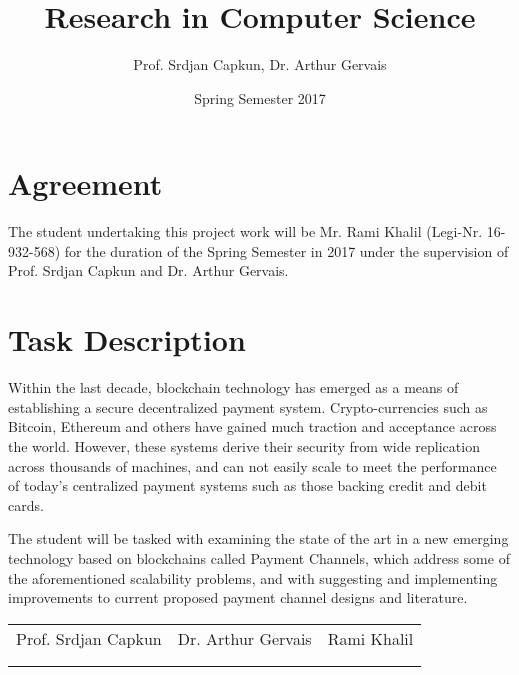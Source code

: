 \documentclass[12pt]{article}
\title{Research in Computer Science}
\date{Spring Semester 2017}
\author{Prof. Srdjan Capkun, Dr. Arthur Gervais}
\begin{document}
\maketitle

\section{Agreement}
The student undertaking this project work will be Mr. Rami Khalil (Legi-Nr. 16-932-568) for the duration of the Spring Semester in 2017 under the supervision of Prof. Srdjan Capkun and Dr. Arthur Gervais.

\section{Task Description}
Within the last decade, blockchain technology has emerged as a means of establishing a secure decentralized payment system. Crypto-currencies such as Bitcoin, Ethereum and others have gained much traction and acceptance across the world. However, these systems derive their security from wide replication across thousands of machines, and can not easily scale to meet the performance of today's centralized payment systems such as those backing credit and debit cards.

The student will be tasked with examining the state of the art in a new emerging technology based on blockchains called Payment Channels, which address some of the aforementioned scalability problems, and with suggesting and implementing improvements to current proposed payment channel designs and literature.

\vspace{5em}

\begin{tabular}{c c c}

Prof. Srdjan Capkun & Dr. Arthur Gervais & Rami Khalil \\

\\

\underline{\hspace{4cm}} & \underline{\hspace{4cm}} & \underline{\hspace{4cm}} \\

\end{tabular}
\end{document}
